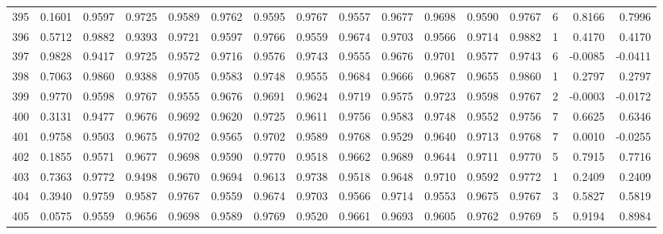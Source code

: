 \begin{tabular}{lrrrrrrrrrrrrrrr}
395 &      0.1601 &  0.9597 &  0.9725 &  0.9589 &  0.9762 &  0.9595 &  0.9767 &  0.9557 &  0.9677 &  0.9698 &   0.9590 &     0.9767 &      6 &                    0.8166 &                     0.7996 \\
396 &      0.5712 &  0.9882 &  0.9393 &  0.9721 &  0.9597 &  0.9766 &  0.9559 &  0.9674 &  0.9703 &  0.9566 &   0.9714 &     0.9882 &      1 &                    0.4170 &                     0.4170 \\
397 &      0.9828 &  0.9417 &  0.9725 &  0.9572 &  0.9716 &  0.9576 &  0.9743 &  0.9555 &  0.9676 &  0.9701 &   0.9577 &     0.9743 &      6 &                   -0.0085 &                    -0.0411 \\
398 &      0.7063 &  0.9860 &  0.9388 &  0.9705 &  0.9583 &  0.9748 &  0.9555 &  0.9684 &  0.9666 &  0.9687 &   0.9655 &     0.9860 &      1 &                    0.2797 &                     0.2797 \\
399 &      0.9770 &  0.9598 &  0.9767 &  0.9555 &  0.9676 &  0.9691 &  0.9624 &  0.9719 &  0.9575 &  0.9723 &   0.9598 &     0.9767 &      2 &                   -0.0003 &                    -0.0172 \\
400 &      0.3131 &  0.9477 &  0.9676 &  0.9692 &  0.9620 &  0.9725 &  0.9611 &  0.9756 &  0.9583 &  0.9748 &   0.9552 &     0.9756 &      7 &                    0.6625 &                     0.6346 \\
401 &      0.9758 &  0.9503 &  0.9675 &  0.9702 &  0.9565 &  0.9702 &  0.9589 &  0.9768 &  0.9529 &  0.9640 &   0.9713 &     0.9768 &      7 &                    0.0010 &                    -0.0255 \\
402 &      0.1855 &  0.9571 &  0.9677 &  0.9698 &  0.9590 &  0.9770 &  0.9518 &  0.9662 &  0.9689 &  0.9644 &   0.9711 &     0.9770 &      5 &                    0.7915 &                     0.7716 \\
403 &      0.7363 &  0.9772 &  0.9498 &  0.9670 &  0.9694 &  0.9613 &  0.9738 &  0.9518 &  0.9648 &  0.9710 &   0.9592 &     0.9772 &      1 &                    0.2409 &                     0.2409 \\
404 &      0.3940 &  0.9759 &  0.9587 &  0.9767 &  0.9559 &  0.9674 &  0.9703 &  0.9566 &  0.9714 &  0.9553 &   0.9675 &     0.9767 &      3 &                    0.5827 &                     0.5819 \\
405 &      0.0575 &  0.9559 &  0.9656 &  0.9698 &  0.9589 &  0.9769 &  0.9520 &  0.9661 &  0.9693 &  0.9605 &   0.9762 &     0.9769 &      5 &                    0.9194 &                     0.8984 \\

\end{tabular}
